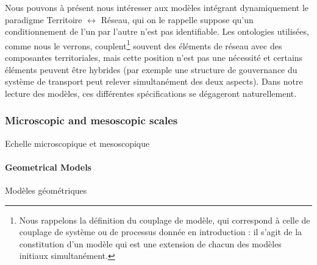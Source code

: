 Nous pouvons à présent nous intéresser aux modèles intégrant dynamiquement le paradigme Territoire $\leftrightarrow$ Réseau, qui on le rappelle suppose qu'un conditionnement de l'un par l'autre n'est pas identifiable. Les ontologies utilisées, comme nous le verrons, couplent\footnote{Nous rappelons la définition du couplage de modèle, qui correspond à celle de couplage de système ou de processus donnée en introduction : il s'agit de la constitution d'un modèle qui est une extension de chacun des modèles initiaux simultanément.} souvent des éléments de réseau avec des composantes territoriales, mais cette position n'est pas une nécessité et certains éléments peuvent être hybrides (par exemple une structure de gouvernance du système de transport peut relever simultanément des deux aspects). Dans notre lecture des modèles, ces différentes spécifications se dégageront naturellement.







\subsubsection{Microscopic and mesoscopic scales}{Echelle microscopique et mesoscopique}


\paragraph{Geometrical Models}{Modèles géométriques}

